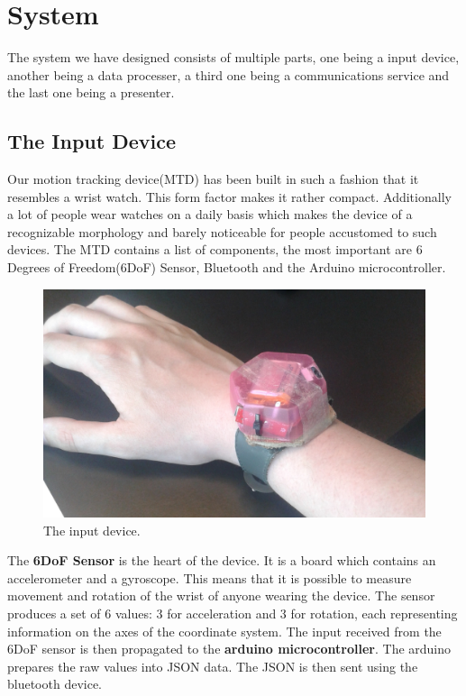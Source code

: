 \section{System}
The system we have designed consists of multiple parts,
one being a input device, another being a data processer, 
a third one being a communications service and the last one being a presenter.

\subsection{The Input Device}
Our motion tracking device(MTD) has been built in such a fashion that it resembles a wrist watch.
This form factor makes it rather compact.
Additionally a lot of people wear watches on a daily basis which makes the device of a recognizable morphology and barely noticeable for people accustomed to such devices.
The MTD contains a list of components, the most important are 6 Degrees of Freedom(6DoF) Sensor, Bluetooth and the Arduino microcontroller.

\begin{figure}[!h]
\centering
\includegraphics[width=1\columnwidth]{img/watch}
\caption{The input device.}
\label{fig:figure5}
\end{figure}

The \textbf{6DoF Sensor} is the heart of the device.
It is a board which contains an accelerometer and a gyroscope.
This means that it is possible to measure movement and rotation of the wrist of anyone wearing the device.
The sensor produces a set of 6 values: 3 for acceleration and 3 for rotation, each representing information on the axes of the coordinate system.
The input received from the 6DoF sensor is then propagated to the \textbf{arduino microcontroller}.
The arduino prepares the raw  values into JSON data. The JSON is then sent using the bluetooth device.

